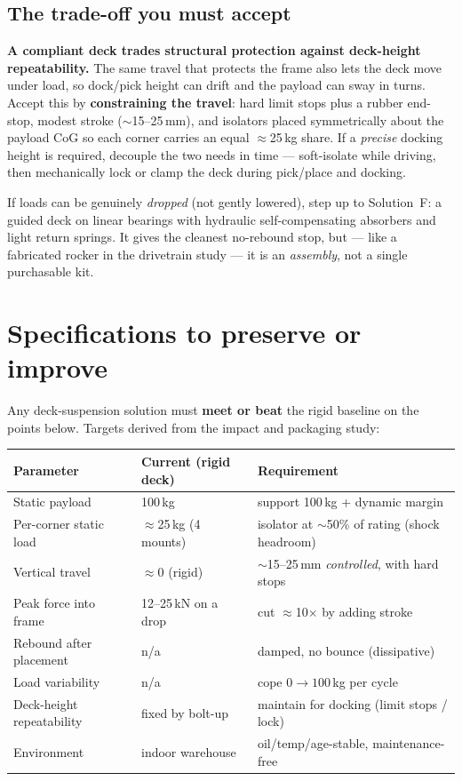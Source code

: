 \documentclass[11pt,a4paper]{article}
\newcommand{\prio}[1]{\colorbox{amber}{\parbox{\dimexpr\linewidth-2\fboxsep}{#1}}}
\begin{document}
\subsection{The trade-off you must accept}
\prio{\textbf{A compliant deck trades structural protection against deck-height repeatability.}
The same travel that protects the frame also lets the deck move under load, so dock/pick height can drift
and the payload can sway in turns. Accept this by \textbf{constraining the travel}: hard limit stops plus
a rubber end-stop, modest stroke ($\sim$15--25\,mm), and isolators placed symmetrically about the payload
CoG so each corner carries an equal $\approx$25\,kg share. If a \emph{precise} docking height is required,
decouple the two needs in time --- soft-isolate while driving, then mechanically lock or clamp the deck
during pick/place and docking.}

\medskip
\noindent If loads can be genuinely \emph{dropped} (not gently lowered), step up to Solution~F: a guided
deck on linear bearings with hydraulic self-compensating absorbers and light return springs. It gives the
cleanest no-rebound stop, but --- like a fabricated rocker in the drivetrain study --- it is an
\emph{assembly}, not a single purchasable kit.

\section{Specifications to preserve or improve}
Any deck-suspension solution must \textbf{meet or beat} the rigid baseline on the points below. Targets
derived from the impact and packaging study:

\begin{center}\small
\renewcommand{\arraystretch}{1.25}
\begin{tabularx}{\linewidth}{@{}p{5.0cm}p{4.0cm}Y@{}}
\toprule
\textbf{Parameter} & \textbf{Current (rigid deck)} & \textbf{Requirement} \\
\midrule
Static payload & 100\,kg & support 100\,kg + dynamic margin \\
Per-corner static load & $\approx$25\,kg (4 mounts) & isolator at $\sim$50\% of rating (shock headroom) \\
Vertical travel & $\approx$0 (rigid) & $\sim$15--25\,mm \emph{controlled}, with hard stops \\
Peak force into frame & 12--25\,kN on a drop & cut $\approx$10$\times$ by adding stroke \\
Rebound after placement & n/a & damped, no bounce (dissipative) \\
Load variability & n/a & cope $0\rightarrow100$\,kg per cycle \\
Deck-height repeatability & fixed by bolt-up & maintain for docking (limit stops / lock) \\
Environment & indoor warehouse & oil/temp/age-stable, maintenance-free \\
\bottomrule
\end{tabularx}
\end{center}
\end{document}
